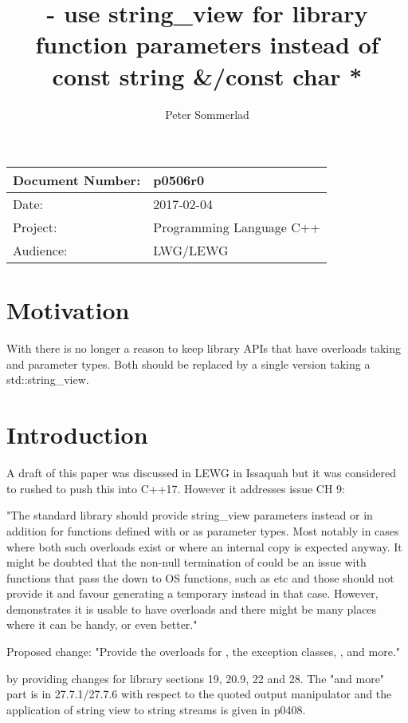 \documentclass[ebook,11pt,article]{memoir}
\title{\papernumber{} - use string\_view for library function parameters instead of const string \&/const char *}
\author{Peter Sommerlad}
\date{\paperdate}                        %
\newcommand{\papernumber}{p0506r0}
\newcommand{\paperdate}{2017-02-04}
\begin{document}
\maketitle
\begin{tabular}[t]{|l|l|}\hline 
Document Number:& \papernumber  \\\hline
Date: & \paperdate \\\hline
Project: & Programming Language C++\\\hline 
Audience: & LWG/LEWG\\\hline
\end{tabular}

\chapter{Motivation}
With  there is no longer a reason to keep library APIs that have overloads taking  and  parameter types. Both should be replaced by a single version taking a std::string_view.

\chapter{Introduction}

A draft of this paper was discussed in LEWG in Issaquah but it was considered to rushed to push this into C++17. However it addresses issue CH 9:

"The standard library should provide string_view parameters instead or in addition for functions defined with  or  as parameter types. Most notably in cases where both such overloads exist or where an internal copy is expected anyway.
It might be doubted that the non-null termination of  could be an issue with functions that pass the  down to OS functions, such as  etc and those should not provide it and favour generating a  temporary instead in that case. However,  demonstrates it is usable to have  overloads and there might be many places where it can be handy, or even better."

Proposed change: "Provide the overloads for , the exception classes, ,  and more."

by providing changes for library sections 19, 20.9, 22 and 28. The "and more" part is in 27.7.1/27.7.6 with respect to the quoted output manipulator and the application of string view to string streams is given in p0408.
\end{document}
